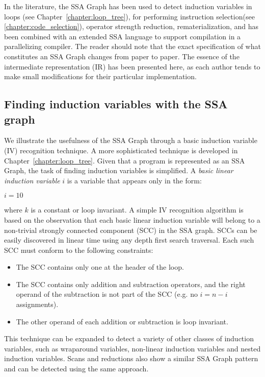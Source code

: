 In the literature, the SSA Graph has been used to detect induction variables in loops (see Chapter~\ref{chapter:loop_tree}), for performing instruction selection\ifcodeselectin (see \ref{chapter:code_selection})\fi, operator strength reduction, rematerialization, and has been combined with an extended SSA language to support compilation in a parallelizing compiler. 
The reader should note that the exact specification of what constitutes an SSA Graph changes from paper to paper. 
The essence of the intermediate representation (IR) has been presented here, as each author tends to make small modifications for their particular implementation.

\subsection{Finding induction variables with the SSA graph}
We illustrate the usefulness of the SSA Graph through a basic induction variable (IV) recognition technique. 
A more sophisticated technique is developed in Chapter~\ref{chapter:loop_tree}. 
Given that a program is represented as an SSA Graph, the task of finding induction variables is simplified. 
A \textit{basic linear induction variable} $i$ is a variable that appears only in the form:

\begin{algorithm}[H]
  $i=10$\;
\end{algorithm}
where $k$ is a constant or loop invariant. 
A simple IV recognition algorithm is based on the observation that each basic linear induction variable will belong to a non-trivial strongly connected component (SCC) in the SSA graph. 
SCCs can be easily discovered in linear time using any depth first search traversal. 
Each such SCC must conform to the following constraints:

\begin{itemize}
\item The SCC contains only one \phifun at the header of the loop.
\item The SCC contains only addition and subtraction operators, and the right operand of the subtraction is not part of the SCC (e.g. no $i=n-i$ assignments).
\item The other operand of each addition or subtraction is loop invariant.
\end{itemize}

This technique can be expanded to detect a variety of other classes of induction variables, such as wraparound variables, non-linear induction variables and nested induction variables. 
Scans and reductions also show a similar SSA Graph pattern and can be detected using the same approach.

